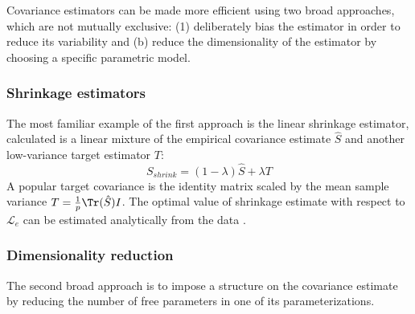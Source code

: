 Covariance estimators can be made more efficient using two broad approaches, which are not mutually exclusive: (1) deliberately bias the estimator in order to reduce its variability and (b) reduce the dimensionality of the estimator by choosing a specific parametric model. 

\subsubsection*{Shrinkage estimators}
The most familiar example of the first approach is the linear shrinkage estimator, calculated is a linear mixture of the empirical covariance estimate $\hat S$ and another low-variance target estimator $T$:
\begin{equation}
S_{shrink} = (1-\lambda) \hat S + \lambda T
\end{equation}
A popular target covariance is the identity matrix scaled by the mean sample variance  $T = \frac 1 p \Tr(\hat S) I$.
The optimal value of shrinkage estimate with respect to $\mathcal L_e$ can be estimated analytically from the data \citep{Ledoit:2004,Schafer:2005}.  

\subsubsection*{Dimensionality reduction}
The second broad approach is to impose a structure on the covariance estimate by reducing the number of free parameters in one of its parameterizations. 